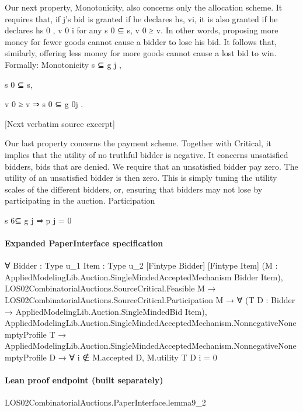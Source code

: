\documentclass[10pt]{article}
\begin{document}
\begin{ReviewVerbatim}

Our next property, Monotonicity, also concerns only the allocation scheme. It
requires that, if j’s bid is granted if he declares hs, vi, it is also granted if he
declares hs 0 , v 0 i for any s 0 ⊆ s, v 0 ≥ v. In other words, proposing more money for
fewer goods cannot cause a bidder to lose his bid. It follows that, similarly, offering
less money for more goods cannot cause a lost bid to win. Formally:
Monotonicity s ⊆ g j ,

s 0 ⊆ s,

v 0 ≥ v ⇒ s 0 ⊆ g 0j .

[Next verbatim source excerpt]

Our last property concerns the payment scheme. Together with Critical, it implies
that the utility of no truthful bidder is negative. It concerns unsatisfied bidders, bids
that are denied. We require that an unsatisfied bidder pay zero. The utility of an
unsatisfied bidder is then zero. This is simply tuning the utility scales of the different
bidders, or, ensuring that bidders may not lose by participating in the auction.
Participation

s 6⊆ g j ⇒ p j = 0
\end{ReviewVerbatim}



\paragraph{Expanded PaperInterface specification}
\begin{ReviewVerbatim}
∀ {Bidder : Type u_1} {Item : Type u_2} [Fintype Bidder] [Fintype Item]
  (M : AppliedModelingLib.Auction.SingleMindedAcceptedMechanism Bidder Item),
  LOS02CombinatorialAuctions.SourceCritical.Feasible M →
    LOS02CombinatorialAuctions.SourceCritical.Participation M →
      ∀ (T D : Bidder → AppliedModelingLib.Auction.SingleMindedBid Item),
        AppliedModelingLib.Auction.SingleMindedAcceptedMechanism.NonnegativeNonemptyProfile T →
          AppliedModelingLib.Auction.SingleMindedAcceptedMechanism.NonnegativeNonemptyProfile D →
            ∀ i ∉ M.accepted D, M.utility T D i = 0
\end{ReviewVerbatim}



\paragraph{Lean proof endpoint (built separately)}\begin{ReviewVerbatim}
LOS02CombinatorialAuctions.PaperInterface.lemma9_2
\end{ReviewVerbatim}
\end{document}
